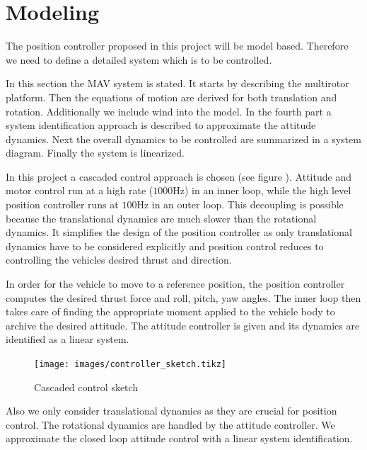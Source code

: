 \chapter{Modeling}
\label{sec:modeling}
The position controller proposed in this project will be model based. Therefore we need to define a detailed system which is to be controlled.

In this section the MAV system is stated. It starts by describing the multirotor platform. Then the equations of motion are derived for both translation and rotation. Additionally we include wind into the model. In the fourth part a system identification approach is described to approximate the attitude dynamics. Next the overall dynamics to be controlled are summarized in a system diagram. Finally the system is linearized.

In this project a cascaded control approach is chosen (see figure ). Attitude and motor control run at a high rate ($1000 \si{\hertz}$) in an inner loop, while the high level position controller runs at $100 \si{\hertz}$ in an outer loop. This decoupling is possible because the translational dynamics are much slower than the rotational dynamics. It simplifies the design of the position controller as only translational dynamics have to be considered explicitly and position control reduces to controlling the vehicles desired thrust and direction. 

In order for the vehicle to move to a reference position, the position controller computes the desired thrust force and roll, pitch, yaw angles. The inner loop then takes care of finding the appropriate moment applied to the vehicle body to archive the desired attitude. The attitude controller is given and its dynamics are identified as a linear system.

\begin{figure}
\centering
\texttt{[image: images/controller\_sketch.tikz]}
\caption{Cascaded control sketch}
\label{pics:controller_sketch}
\end{figure}





Also we only consider translational dynamics as they are crucial for position control. The rotational dynamics are handled by the attitude controller. We approximate the closed loop attitude control with a linear system identification.

